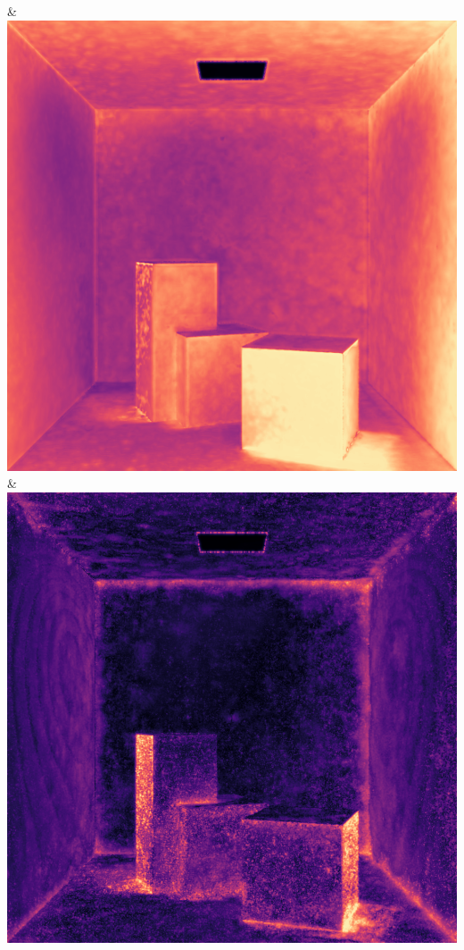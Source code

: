 & \includegraphics[width=\linewidth]{figures/py/tests/quality_comparison/nrc+pt+sl_1spp_diffuse_flip.png}
& \includegraphics[width=\linewidth]{figures/py/tests/quality_comparison/nrc+bt_1spp_diffuse_flip.png}
